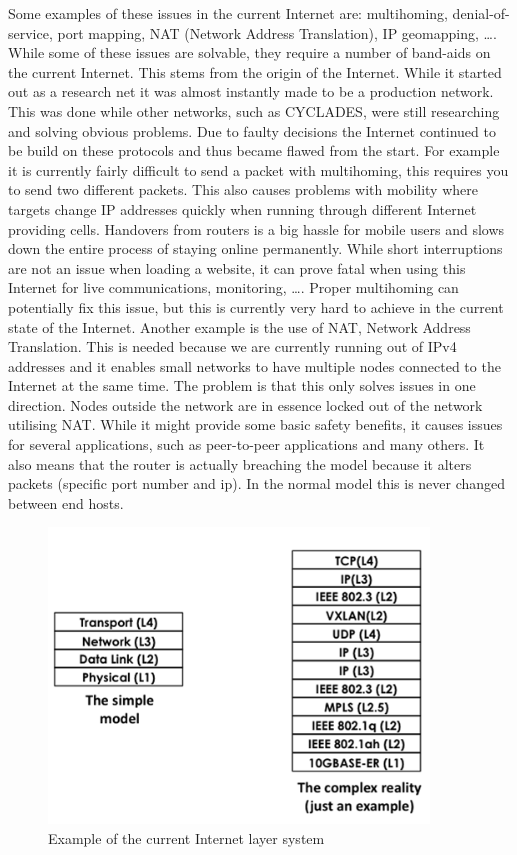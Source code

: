 Some examples of these issues in the current Internet are: multihoming, denial-of-service, port mapping, NAT (Network Address Translation), IP geomapping, \ldots. While some of these issues are solvable, they require a number of band-aids on the current Internet. This stems from the origin of the Internet. While it started out as a research net it was almost instantly made to be a production network. This was done while other networks, such as CYCLADES, were still researching and solving obvious problems. Due to faulty decisions the Internet continued to be build on these protocols and thus became flawed from the start. For example it is currently fairly difficult to send a packet with multihoming, this requires you to send two different packets. This also causes problems with mobility where targets change IP addresses quickly when running through different Internet providing cells. Handovers from routers is a big hassle for mobile users and slows down the entire process of staying online permanently. While short interruptions are not an issue when loading a website, it can prove fatal when using this Internet for live communications, monitoring, \ldots. Proper multihoming can potentially fix this issue, but this is currently very hard to achieve in the current state of the Internet. 
\npar
Another example is the use of NAT, Network Address Translation. This is needed because we are currently running out of IPv4 addresses and it enables small networks to have multiple nodes connected to the Internet at the same time. The problem is that this only solves issues in one direction. Nodes outside the network are in essence locked out of the network utilising NAT. While it might provide some basic safety benefits, it causes issues for several applications, such as peer-to-peer applications and many others. It also means that the router is actually breaching the model because it alters packets (specific port number and ip). In the normal model this is never changed between end hosts.
\npar
\begin{figure}[H]
    \centering
    \includegraphics[width=0.9\textwidth]{figures/layeractualexamplenorina}
    \caption{Example of the current Internet layer system \citep{vrijders2014prototyping}} 
    \label{fig:layeractualexamplenorina}
\end{figure}
